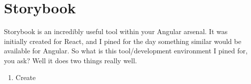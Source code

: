 \chapter{Storybook}
Storybook is an incredibly useful tool within your Angular arsenal. It was initially created for React, and I pined for the day something similar would be available for Angular. So what is this tool/development environment I pined for, you ask? Well it does two things really well. 
\begin{enumerate}
  \item Create 
\end{enumerate}